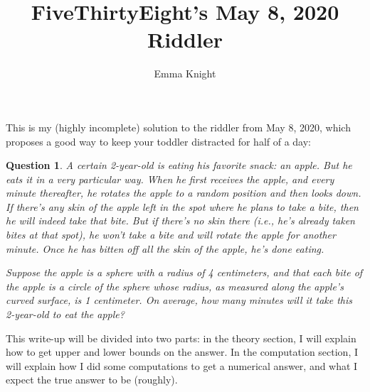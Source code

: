\documentclass[11pt]{article}
\title{FiveThirtyEight's May 8, 2020 Riddler}
\author{Emma Knight}
\newtheorem{question}[theorem]{Question}
\theoremstyle{definition}
\begin{document}
\maketitle
This is my (highly incomplete) solution to the riddler from May 8, 2020, which proposes a good way to keep your toddler distracted for half of a day:

\begin{question}
A certain 2-year-old is eating his favorite snack: an apple. But he eats it in a very particular way. When he first receives the apple, and every minute thereafter, he rotates the apple to a random position and then looks down. If there's any skin of the apple left in the spot where he plans to take a bite, then he will indeed take that bite. But if there's no skin there (i.e., he's already taken bites at that spot), he won't take a bite and will rotate the apple for another minute.  Once he has bitten off all the skin of the apple, he's done eating.

Suppose the apple is a sphere with a radius of 4 centimeters, and that each bite of the apple is a circle of the sphere whose radius, as measured along the apple's curved surface, is 1 centimeter. On average, how many minutes will it take this 2-year-old to eat the apple?
\end{question}
This write-up will be divided into two parts: in the theory section, I will explain how to get upper and lower bounds on the answer.  In the computation section, I will explain how I did some computations to get a numerical answer, and what I expect the true answer to be (roughly).
\end{document}
